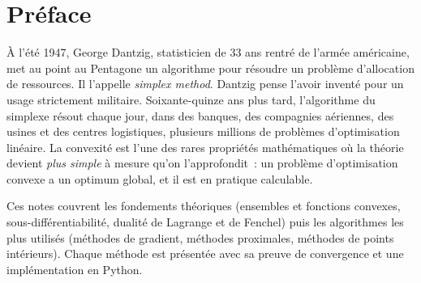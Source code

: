 \documentclass[12pt,a4paper,twoside]{book}
\theoremstyle{definition}
\theoremstyle{plain}
\theoremstyle{remark}
\begin{document}
\begin{titlepage}
\end{titlepage}

\frontmatter
\tableofcontents


\chapter*{Pr\'eface}

\`A l'\'et\'e 1947, George Dantzig, statisticien de 33 ans rentr\'e de l'arm\'ee am\'ericaine, met au point au Pentagone un algorithme pour r\'esoudre un probl\`eme d'allocation de ressources. Il l'appelle \emph{simplex method}. Dantzig pense l'avoir invent\'e pour un usage strictement militaire. Soixante-quinze ans plus tard, l'algorithme du simplexe r\'esout chaque jour, dans des banques, des compagnies a\'eriennes, des usines et des centres logistiques, plusieurs millions de probl\`emes d'optimisation lin\'eaire. La convexit\'e est l'une des rares propri\'et\'es math\'ematiques o\`u la th\'eorie devient \emph{plus simple} \`a mesure qu'on l'approfondit~: un probl\`eme d'optimisation convexe a un optimum global, et il est en pratique calculable.

\medskip

Ces notes couvrent les fondements th\'eoriques (ensembles et fonctions convexes, sous-diff\'erentiabilit\'e, dualit\'e de Lagrange et de Fenchel) puis les algorithmes les plus utilis\'es (m\'ethodes de gradient, m\'ethodes proximales, m\'ethodes de points int\'erieurs). Chaque m\'ethode est pr\'esent\'ee avec sa preuve de convergence et une impl\'ementation en Python.
\end{document}
